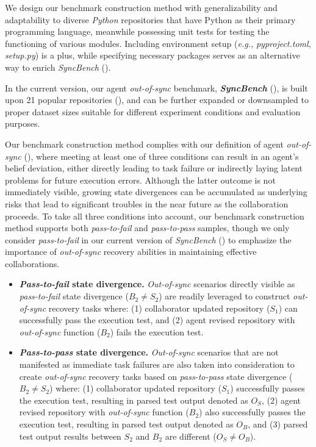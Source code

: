 We design our benchmark construction method  with generalizability and adaptability to diverse \textit{Python} repositories that have Python as their primary programming language, meanwhile possessing unit tests for testing the functioning of various modules.
Including environment setup (\textit{e.g.,} \textit{pyproject.toml}, \textit{setup.py}) is a plus, while specifying necessary packages serves as an alternative way to enrich \textit{SyncBench} ().

In the current version, our agent \textit{out-of-sync} benchmark, \textbf{\textit{SyncBench}} (), is built upon 21 popular \github repositories (), and can be further expanded or downsampled to proper dataset sizes suitable for different experiment conditions and evaluation purposes.

Our benchmark construction method complies with our definition of agent \textit{out-of-sync} (), where meeting at least one of three conditions can result in an agent's belief deviation, either directly leading to task failure or indirectly laying latent problems for future execution errors.
Although the latter outcome is not immediately visible, growing state divergences can be accumulated as underlying risks that lead to significant troubles in the near future as the collaboration proceeds.
To take all three conditions into account, our benchmark construction method supports both \textit{pass-to-fail} and \textit{pass-to-pass} samples, though we only consider \textit{pass-to-fail} in our current version of \textit{SyncBench} () to emphasize the importance of \textit{out-of-sync} recovery abilities in maintaining effective collaborations.

\begin{itemize}[noitemsep,topsep=0pt,parsep=2pt,partopsep=0pt,leftmargin=*]
    \item \textbf{\textit{Pass-to-fail} state divergence.} \textit{Out-of-sync} scenarios directly visible as \textit{pass-to-fail} state divergence ($B_2 \neq S_2$) are readily leveraged to construct \textit{out-of-sync} recovery tasks where: (1) collaborator updated repository ($S_1$) can successfully pass the execution test, and (2) agent revised repository with \textit{out-of-sync} function ($B_2$) fails the execution test.
    \item \textbf{\textit{Pass-to-pass} state divergence.} \textit{Out-of-sync} scenarios that are not manifested as immediate task failures are also taken into consideration to create \textit{out-of-sync} recovery tasks based on \textit{pass-to-pass} state divergence ($B_2 \neq S_2$) where: (1) collaborator updated repository ($S_1$) successfully passes the execution test, resulting in parsed test output denoted as $O_S$, (2) agent revised repository with \textit{out-of-sync} function ($B_2$) also successfully passes the execution test, resulting in parsed test output denoted as $O_B$, and (3) parsed test output results between $S_2$ and $B_2$ are different ($O_S \neq O_B$).
\end{itemize}

